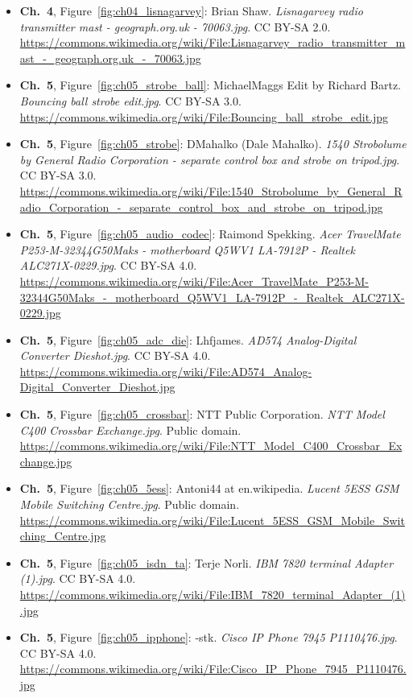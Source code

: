 \begin{small}
\begin{itemize}[leftmargin=0pt,itemsep=2pt,label={}]
\item \textbf{Ch.~4}, Figure~\ref{fig:ch04_lisnagarvey}: Brian Shaw. \emph{Lisnagarvey radio transmitter mast -\allowbreak{} geograph.\allowbreak{}org.\allowbreak{}uk -\allowbreak{} 70063.\allowbreak{}jpg}. CC BY-SA 2.0. \url{https://commons.wikimedia.org/wiki/File:Lisnagarvey_radio_transmitter_mast_-_geograph.org.uk_-_70063.jpg}
\item \textbf{Ch.~5}, Figure~\ref{fig:ch05_strobe_ball}: MichaelMaggs Edit by Richard Bartz. \emph{Bouncing ball strobe edit.\allowbreak{}jpg}. CC BY-SA 3.0. \url{https://commons.wikimedia.org/wiki/File:Bouncing_ball_strobe_edit.jpg}
\item \textbf{Ch.~5}, Figure~\ref{fig:ch05_strobe}: DMahalko (Dale Mahalko). \emph{1540 Strobolume by General Radio Corporation -\allowbreak{} separate control box and strobe on tripod.\allowbreak{}jpg}. CC BY-SA 3.0. \url{https://commons.wikimedia.org/wiki/File:1540_Strobolume_by_General_Radio_Corporation_-_separate_control_box_and_strobe_on_tripod.jpg}
\item \textbf{Ch.~5}, Figure~\ref{fig:ch05_audio_codec}: Raimond Spekking. \emph{Acer TravelMate P253-\allowbreak{}M-\allowbreak{}32344G50Maks -\allowbreak{} motherboard Q5WV1 LA-\allowbreak{}7912P -\allowbreak{} Realtek ALC271X-\allowbreak{}0229.\allowbreak{}jpg}. CC BY-SA 4.0. \url{https://commons.wikimedia.org/wiki/File:Acer_TravelMate_P253-M-32344G50Maks_-_motherboard_Q5WV1_LA-7912P_-_Realtek_ALC271X-0229.jpg}
\item \textbf{Ch.~5}, Figure~\ref{fig:ch05_adc_die}: Lhfjames. \emph{AD574 Analog-\allowbreak{}Digital Converter Dieshot.\allowbreak{}jpg}. CC BY-SA 4.0. \url{https://commons.wikimedia.org/wiki/File:AD574_Analog-Digital_Converter_Dieshot.jpg}
\item \textbf{Ch.~5}, Figure~\ref{fig:ch05_crossbar}: NTT Public Corporation. \emph{NTT Model C400 Crossbar Exchange.\allowbreak{}jpg}. Public domain. \url{https://commons.wikimedia.org/wiki/File:NTT_Model_C400_Crossbar_Exchange.jpg}
\item \textbf{Ch.~5}, Figure~\ref{fig:ch05_5ess}: Antoni44 at en.wikipedia. \emph{Lucent 5ESS GSM Mobile Switching Centre.\allowbreak{}jpg}. Public domain. \url{https://commons.wikimedia.org/wiki/File:Lucent_5ESS_GSM_Mobile_Switching_Centre.jpg}
\item \textbf{Ch.~5}, Figure~\ref{fig:ch05_isdn_ta}: Terje Norli. \emph{IBM 7820 terminal Adapter (1).\allowbreak{}jpg}. CC BY-SA 4.0. \url{https://commons.wikimedia.org/wiki/File:IBM_7820_terminal_Adapter_(1).jpg}
\item \textbf{Ch.~5}, Figure~\ref{fig:ch05_ipphone}: -stk. \emph{Cisco IP Phone 7945 P1110476.\allowbreak{}jpg}. CC BY-SA 4.0. \url{https://commons.wikimedia.org/wiki/File:Cisco_IP_Phone_7945_P1110476.jpg}

\end{itemize}
\end{small}
